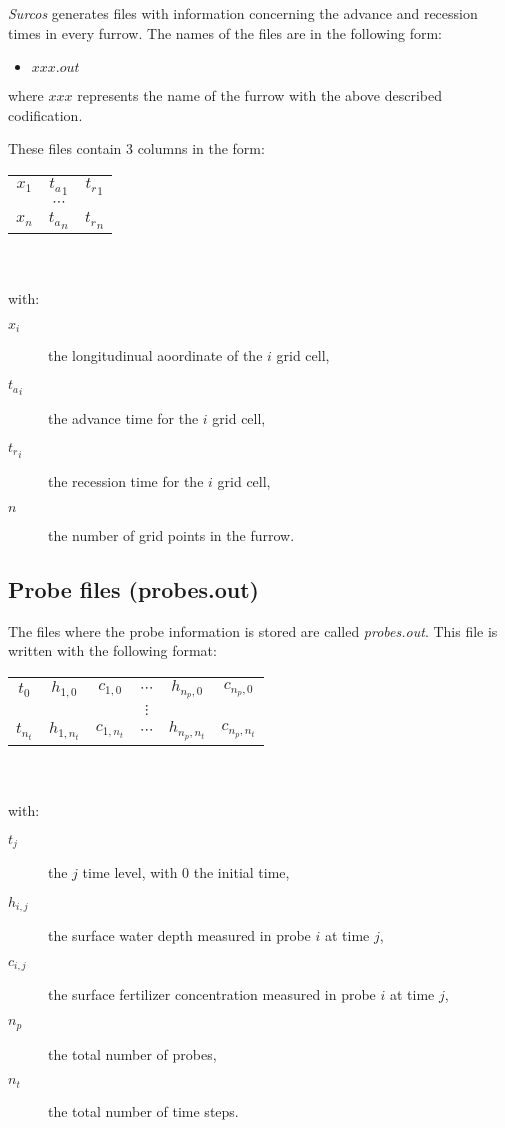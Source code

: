 \emph{Surcos} generates files with information concerning the advance and recession times in every furrow. 
The names of the files are in the following form: 
\begin{itemize}
\item $xxx.out$
\end{itemize}
where $xxx$ represents the name of the furrow with the above described codification. 

These files contain 3 columns in the form:\\
\begin{tabular}{ccc}
$x_1$& ${t_a}_1$& ${t_r}_1$\\
&$\cdots$\\
$x_n$& ${t_a}_n$& ${t_r}_n$\\
\end{tabular}\\\\
with:
\begin{description}
\item[$x_i$] the longitudinual aoordinate of the $i$ grid cell,
\item[${t_a}_i$] the advance time for the $i$ grid cell,
\item[${t_r}_i$] the recession time for the $i$ grid cell,
\item[$n$] the number of grid points in the furrow.
\end{description}

\subsection{Probe files (probes.out)}

The files where the probe information is stored are called \emph{probes.out}. This file is written with the following format:\\
\begin{tabular}{cccccc}
$t_0$ & $h_{1,0}$ & $c_{1,0}$ & $\cdots$ & $h_{n_p,0}$ & $c_{n_p,0}$\\
&&&$\vdots$\\
$t_{n_t}$ & $h_{1,n_t}$ & $c_{1,n_t}$ & $\cdots$ & $h_{n_p,n_t}$ & $c_{n_p,n_t}$
\end{tabular}\\\\
with:
\begin{description}
\item[$t_j$] the $j$ time level, with 0 the initial time,
\item[$h_{i,j}$] the surface water depth measured in probe $i$ at time $j$,
\item[$c_{i,j}$] the surface fertilizer concentration measured in probe $i$ at time $j$,
\item[$n_p$] the total number of probes,
\item[$n_t$] the total number of time steps.
\end{description}
